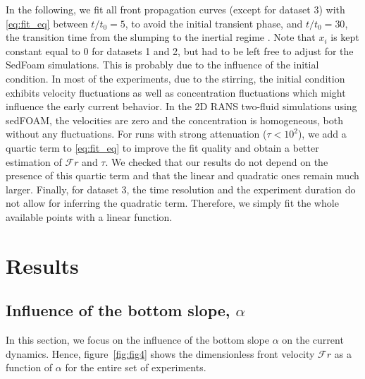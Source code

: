 \documentclass[12pt]{article}
\begin{document}
In the following, we fit all front propagation curves (except for dataset 3) with \eqref{eq:fit_eq} between $t/t_{0} = 5$, to avoid the initial transient phase, and $t/t_{0} = 30$, the transition time from the slumping to the inertial regime \citep[similar to $X_{\text{t}}/L_{0}\approx 10$ as mentioned in section \ref{sec:intro_lockrelease}; see also e.g.][]{Rottman1983, Sher2015, Ottolenghi2016}. Note that $x_{i}$ is kept constant equal to 0 for datasets 1 and 2, but had to be left free to adjust for the SedFoam simulations. This is probably due to the influence of the initial condition. In most of the experiments, due to the stirring, the initial condition exhibits velocity fluctuations as well as concentration fluctuations which might influence the early current behavior. In the 2D RANS two-fluid simulations using sedFOAM, the velocities are zero and the concentration is homogeneous, both without any fluctuations. For runs with strong attenuation ($\tau < 10^{2}$), we add a quartic term to \eqref{eq:fit_eq} to improve the fit quality and obtain a better estimation of $\mathcal{F}r$ and $\tau$. We checked that our results do not depend on the presence of this quartic term and that the linear and quadratic ones remain much larger. Finally, for dataset 3, the time resolution and the experiment duration do not allow for inferring the quadratic term. Therefore, we simply fit the whole available points with a linear function.

\section{Results}
\label{sec:results}

\subsection{Influence of the bottom slope, $\alpha$}
\label{sec:influence_slope}

In this section, we focus on the influence of the bottom slope $\alpha$ on the current dynamics. Hence, figure~\ref{fig:fig4} shows the dimensionless front velocity $\mathcal{F}r$ as a function of $\alpha$ for the entire set of experiments.
\end{document}
